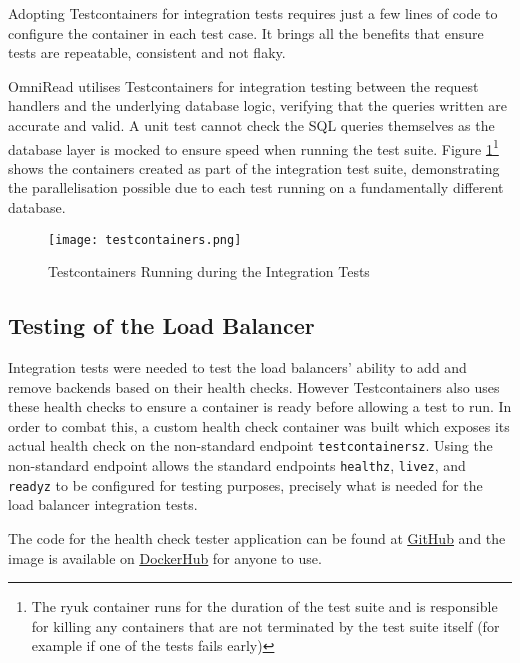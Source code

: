 Adopting Testcontainers for integration tests requires just a few lines of code to configure the container in each test case.
It brings all the benefits that ensure tests are repeatable, consistent and not flaky.

OmniRead utilises Testcontainers for integration testing between the request handlers and the underlying database logic, verifying that the queries written are accurate and valid.
A unit test cannot check the SQL queries themselves as the database layer is mocked to ensure speed when running the test suite.
Figure \ref{fig:testcontainers}\footnote{The ryuk container runs for the duration of the test suite and is responsible for killing any containers that are not terminated by the test suite itself (for example if one of the tests fails early)} shows the containers created as part of the integration test suite, demonstrating the parallelisation possible due to each test running on a fundamentally different database.

\begin{figure}[htbp]
\texttt{[image: testcontainers.png]}
\centering
\caption{Testcontainers Running during the Integration Tests}
\label{fig:testcontainers}
\end{figure}

\subsection{Testing of the Load Balancer}
Integration tests were needed to test the load balancers' ability to add and remove backends based on their health checks.
However Testcontainers also uses these health checks to ensure a container is ready before allowing a test to run.
In order to combat this, a custom health check container was built which exposes its actual health check on the non-standard endpoint \verb|testcontainersz|.
Using the non-standard endpoint allows the standard endpoints \verb|healthz|, \verb|livez|, and \verb|readyz| to be configured for testing purposes, precisely what is needed for the load balancer integration tests. 

The code for the health check tester application can be found at \underline{\href{https://github.com/harrydayexe/healthcheck-tester}{GitHub}} and the image is available on \underline{\href{https://hub.docker.com}{DockerHub}} for anyone to use.

